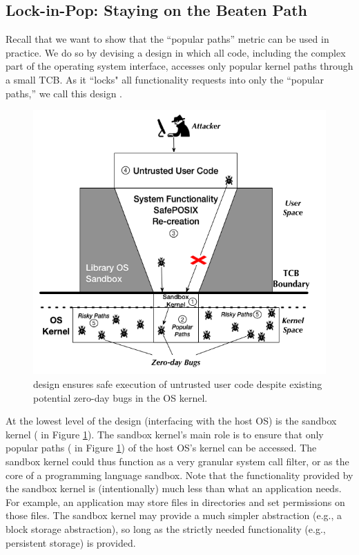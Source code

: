 \subsection{Lock-in-Pop: Staying on the Beaten Path}
\label{lock-in-pop}

Recall that we want to show that the ``popular paths'' metric can be used in practice.
We do so by devising a design
in which all code, including the complex part
of the operating system interface, accesses only
popular kernel paths through a small TCB. As it ``locks" all functionality
requests into only the ``popular paths,'' we call this design \lip.

\begin{figure}%
\centering
\includegraphics[width=1.0\columnwidth]{diagram/Virtualization_Design_Model_01.png}
\caption{\small \lip design ensures safe execution of untrusted user code
despite existing potential zero-day bugs in the OS kernel.}
\label{fig:design_safe_reimplementation}
\end{figure}

At the lowest level of the design (interfacing with the host OS) is the
sandbox kernel ( in Figure \ref{fig:design_safe_reimplementation}).
The sandbox kernel's main role is to ensure that only popular paths ( in Figure \ref{fig:design_safe_reimplementation})
of the host OS's kernel can be accessed.
The sandbox kernel could thus function as a very granular system call filter, or
as the core of a programming language sandbox. Note that the functionality
provided by the sandbox kernel is (intentionally) much less than what
an application needs. For example, an application may store files in directories and set permissions on those files.
The sandbox kernel may provide a much simpler abstraction (e.g., a block storage abstraction),
so long as the strictly needed functionality (e.g., persistent storage) is provided.

